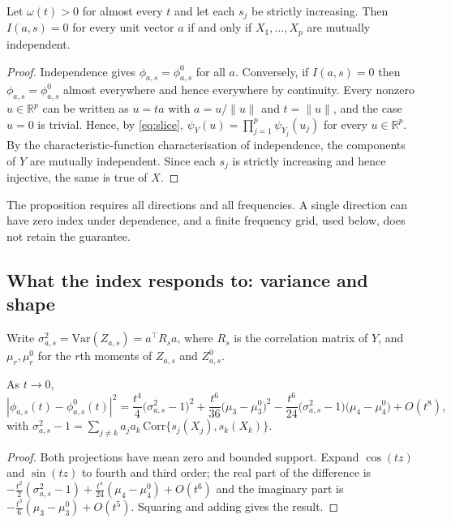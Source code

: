 \begin{proposition}\label{prop:char}
Let $\omega(t)>0$ for almost every $t$ and let each $s_j$ be strictly increasing. Then $I(a,s)=0$ for every unit vector $a$ if and only if $X_1,\ldots,X_p$ are mutually independent.
\end{proposition}
\begin{proof}
Independence gives $\phi_{a,s}=\phi^0_{a,s}$ for all $a$. Conversely, if $I(a,s)=0$ then $\phi_{a,s}=\phi^0_{a,s}$ almost everywhere and hence everywhere by continuity. Every nonzero $u\in\mathbb{R}^p$ can be written as $u=ta$ with $a=u/\|u\|$ and $t=\|u\|$, and the case $u=0$ is trivial. Hence, by \eqref{eq:slice}, $\psi_Y(u)=\prod_{j=1}^p\psi_{Y_j}(u_j)$ for every $u\in\mathbb{R}^p$. By the characteristic-function characterisation of independence, the components of $Y$ are mutually independent. Since each $s_j$ is strictly increasing and hence injective, the same is true of $X$.
\end{proof}

The proposition requires all directions and all frequencies. A single direction can have zero index under dependence, and a finite frequency grid, used below, does not retain the guarantee.

\subsection{What the index responds to: variance and shape}
Write $\sigma^2_{a,s}=\mathrm{Var}(Z_{a,s})=a^\top R_s a$, where $R_s$ is the correlation matrix of $Y$, and $\mu_r,\mu_r^0$ for the $r$th moments of $Z_{a,s}$ and $Z^0_{a,s}$.

\begin{proposition}\label{prop:expansion}
As $t\to0$,
\[
 |\phi_{a,s}(t)-\phi^0_{a,s}(t)|^2=\frac{t^4}{4}\bigl(\sigma^2_{a,s}-1\bigr)^2
 +\frac{t^6}{36}\bigl(\mu_3-\mu_3^0\bigr)^2-\frac{t^6}{24}\bigl(\sigma^2_{a,s}-1\bigr)\bigl(\mu_4-\mu_4^0\bigr)+O(t^8),
\]
with $\sigma^2_{a,s}-1=\sum_{j\neq k}a_ja_k\,\mathrm{Corr}\{s_j(X_j),s_k(X_k)\}$.
\end{proposition}
\begin{proof}
Both projections have mean zero and bounded support. Expand $\cos(tz)$ and $\sin(tz)$ to fourth and third order; the real part of the difference is $-\tfrac{t^2}{2}(\sigma^2_{a,s}-1)+\tfrac{t^4}{24}(\mu_4-\mu_4^0)+O(t^6)$ and the imaginary part is $-\tfrac{t^3}{6}(\mu_3-\mu_3^0)+O(t^5)$. Squaring and adding gives the result.
\end{proof}

